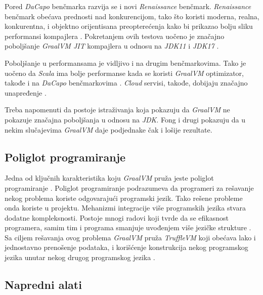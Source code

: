 \documentclass[a4paper]{article}
\begin{document}
Pored \emph{DaCapo} benčmarka razvija se i novi \emph{Renaissance} benčmark. \emph{Renaissance} benčmark obećava prednosti nad konkurencijom, tako što koristi moderna, realna, konkurentna, i objektno orijentisana preopterećenja kako bi prikazao bolju sliku performansi kompajlera \cite{prokopec19}. Pokretanjem ovih testova uočeno je značajno poboljšanje \emph{GraalVM JIT} kompajlera u odnosu na \emph{JDK11} i \emph{JDK17} \cite{renaissance}.

Poboljšanje u performansama je vidljivo i na drugim benčmarkovima. Tako je uočeno da \emph{Scala} ima bolje performanse kada se koristi \emph{GraalVM} optimizator, takođe i na \emph{DaCapo} benčmarkovima \cite{stadler13, dacapo}. \emph{Cloud} servisi, takođe, dobijaju značajno unapređenje \cite{sipek21}. 

Treba napomenuti da postoje istraživanja koja pokazuju da \emph{GraalVM} ne pokazuje značajna poboljšanja u odnosu na \emph{JDK}. Fong i drugi \cite{fong21} pokazuju da u nekim slučajevima \emph{GraalVM} daje podjednake čak i lošije rezultate. 



\subsection{Poliglot programiranje}
\label{sub:poliglot}

Jedna od ključnih karakteristika koju \emph{GraalVM} pruža jeste poliglot programiranje \cite{graalvm}. Poliglot programiranje podrazumeva da programeri za rešavanje nekog problema koriste odgovarajući programski jezik. Tako rešene probleme onda koriste u projektu. Mehanizmi integracije više programskih jezika stvara dodatne kompleksnosti. Postoje mnogi radovi koji tvrde da se efikasnost programera, samim tim i programa smanjuje uvođenjem više jezičke strukture \cite{peterson21, hao20}. Sa ciljem rešavanja ovog problema \emph{GraalVM} pruža \emph{TruffleVM} koji obećava lako i jednostavno prenošenje podataka, i korišćenje konstrukcija nekog programskog jezika unutar nekog drugog programskog jezika \cite{grimmer15}.

\subsection{Napredni alati}
\label{sub:alati}
\end{document}
